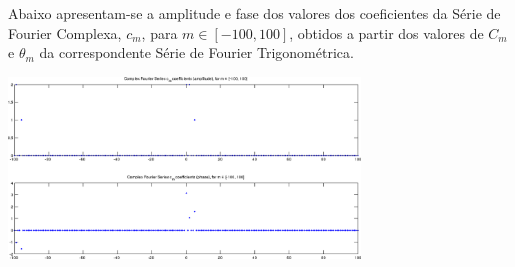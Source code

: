 \documentclass[a4paper]{article}
\begin{document}
\noindent Abaixo apresentam-se a amplitude e fase dos valores dos coeficientes da Série de Fourier Complexa, $c_m$, para $m \in [-100, 100]$, obtidos a partir dos valores de $C_m$ e $\theta_m$ da correspondente Série de Fourier Trigonométrica.
\begin{center}
	\includegraphics[width=0.70\textwidth]{images/ex2_2_4_complex_cm.png}
	\label{fig:ex2_2_4_complex_cm}
\end{center}
\end{document}
